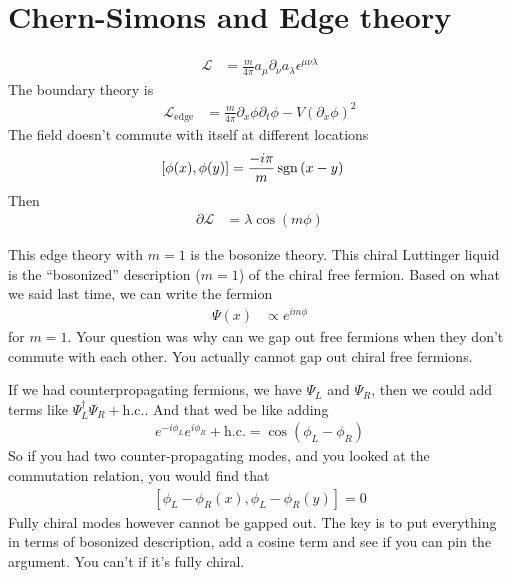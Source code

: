 \section{Chern-Simons and Edge theory}
\begin{align}
    \mathcal{L} &=
    \frac{m}{4\pi} a_\mu \partial_\nu a_\lambda \epsilon^{\mu\nu\lambda}
\end{align}
The boundary theory is
\begin{align}
    \mathcal{L}_{\mathrm{edge}}
    &=
    \frac{m}{4\pi}
    \partial_x \phi \partial_t \phi
    -
    V \left( \partial_x \phi \right)^2
\end{align}
The field doesn't commute with itself at different locations
\begin{align}
    \left[ \phi(x) , \phi(y) \right]
    &=
    \frac{-i\pi}{m}
    \operatorname{sgn}\left( x - y \right)
\end{align}
Then
\begin{align}
    \partial\mathcal{L}
    &=
    \lambda\cos\left( m\phi \right)
\end{align}

This edge theory with $m=1$ is the bosonize theory.
This chiral Luttinger liquid is the ``bosonized'' description
($m=1$) of the chiral free fermion.
Based on what we said last time,
we can write the fermion
\begin{align}
    \Psi(x)
    &\propto
    e^{im\phi}
\end{align}
for $m=1$.
Your question was why can we gap out free fermions when they don't commute with
each other.
You actually cannot gap out chiral free fermions.

If we had counterpropagating fermions,
we have $\Psi_L$ and $\Psi_R$,
then we could add terms like
$\Psi_L^\dagger \Psi_R + \mathrm{h.c.}$.
And that wed be like adding
\begin{align}
    e^{-i\phi_L} e^{i\phi_R} + \mathrm{h.c.}
    = \cos\left( \phi_L - \phi_R \right)
\end{align}
So if you had two counter-propagating modes,
and you looked at the commutation relation,
you would find that
\begin{align}
    \left[ \phi_L - \phi_R(x),
    \phi_L - \phi_R(y)
    \right] = 0
\end{align}
Fully chiral modes however cannot be gapped out.
The key is to put everything in terms of bosonized description,
add a cosine term and see if you can pin the argument.
You can't if it's fully chiral.

